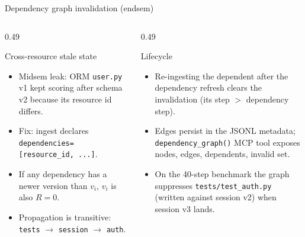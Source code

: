 \documentclass[aspectratio=169,10pt]{beamer}
\begin{document}
\begin{frame}{Dependency graph invalidation (endsem)}
  \begin{columns}[T,onlytextwidth]
    \begin{column}{0.49\textwidth}
      \begin{block}{Cross-resource stale state}
        \begin{itemize}
          \item Midsem leak: ORM \texttt{user.py} v1 kept scoring after schema v2 because its resource id differs.
          \item Fix: ingest declares \texttt{dependencies=[resource\_id, ...]}.
          \item If any dependency has a newer version than $v_i$, $v_i$ is also $R=0$.
          \item Propagation is transitive: \texttt{tests} $\to$ \texttt{session} $\to$ \texttt{auth}.
        \end{itemize}
      \end{block}
    \end{column}
    \begin{column}{0.49\textwidth}
      \begin{block}{Lifecycle}
        \begin{itemize}
          \item Re-ingesting the dependent after the dependency refresh clears the invalidation (its step $>$ dependency step).
          \item Edges persist in the JSONL metadata; \texttt{dependency\_graph()} MCP tool exposes nodes, edges, dependents, invalid set.
          \item On the 40-step benchmark the graph suppresses \texttt{tests/test\_auth.py} (written against session v2) when session v3 lands.
        \end{itemize}
      \end{block}
    \end{column}
  \end{columns}
\end{frame}
\end{document}
